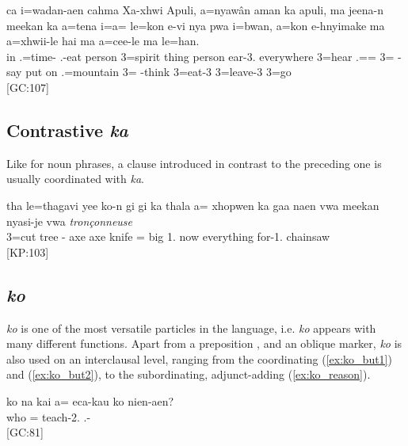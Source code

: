 \ea\label{ex:hai_ma}\gll ca i=wadan-aen {cahma} Xa-xhwi Apuli, a=nyawân aman ka apuli, ma jeena-n meekan ka a=tena i=a= le=kon e-vi nya pwa i=bwan, a=kon e-hnyimake ma a=xhwii-le {hai} {ma} a=cee-le ma le=han.\\
 in .=time-  .-eat person 3=spirit thing  person  ear-3. everywhere  3=hear .== 3= -say put on .=mountain 3= -think  3=eat-3   3=leave-3  3=go\\
\glt {} {[GC:107]}
\z

\subsection{Contrastive \textit{ka}}
Like for noun phrases, a clause introduced in contrast to the preceding one is usually coordinated with \textit{ka}.

\ea\gll tha le=thagavi yee ko-n gi gi ka thala a= xhopwen {ka} gaa naen vwa meekan nyasi-je vwa \textit{tronçonneuse}\\
  3=cut tree - axe axe  knife = big  1. now  everything for-1.  chainsaw\\
\glt {} {[KP:103]}
\z


\subsection{\textit{ko} }
\label{sec:conj_ko}
\textit{ko}  is one of the most versatile particles in the language, i.e. \textit{ko} appears with many different functions. Apart from a preposition , and an oblique marker, \textit{ko} is also used on an interclausal level, ranging from the coordinating  (\ref{ex:ko_but1}) and (\ref{ex:ko_but2}), to the subordinating, adjunct-adding  (\ref{ex:ko_reason}).


\ea\label{ex:ko_but1}\gll ko na kai a= eca-kau ko nien-aen?\\
   who = teach-2.  .-\\
\glt {} {[GC:81]}
\z

